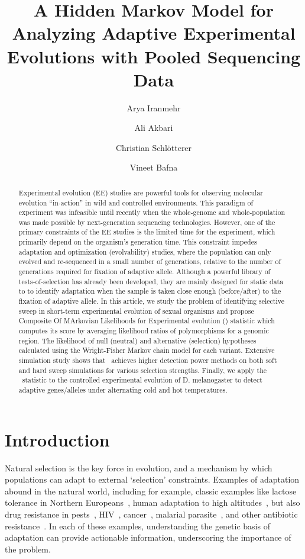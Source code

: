 \documentclass[11pt]{article}
\title{A Hidden Markov Model for Analyzing Adaptive Experimental Evolutions with Pooled Sequencing Data}
\author[1]{Arya Iranmehr}
\author[1]{Ali Akbari}
\author[2]{Christian Schl\"{o}tterer}
\author[3]{Vineet Bafna}
\affil[1]{\footnotesize Electrical and Computer Engineering, University of California, San Diego, La Jolla, CA 92093, USA.}
\affil[2]{\footnotesize Institut f\"{u}r Populationsgenetik, Vetmeduni, Vienna, Austria.}
\affil[3]{\footnotesize Computer Science \& Engineering, University of California, San Diego, La Jolla, CA 92093, USA}
\date{}
\def\comale{\text{{\sc Comale}}}
\begin{document}
\maketitle
\begin{abstract}
  Experimental evolution (EE) studies are powerful tools for observing
  molecular evolution ``in-action'' in wild and controlled
  environments. This paradigm of experiment was infeasible until
  recently when the whole-genome and whole-population was made
  possible by next-generation sequencing technologies.  However, one
  of the primary constraints of the EE studies is the limited time for
  the experiment, which primarily depend on the organism's generation
  time. This constraint impedes adaptation and optimization
  (evolvability) studies, where the population can only evolved and
  re-sequenced in a small number of generations, relative to the
  number of generations required for fixation of adaptive allele.
  Although a powerful library of tests-of-selection has already been
  developed, they are mainly designed for static data to to identify
  adaptation when the sample is taken close enough (before/after) to
  the fixation of adaptive allele.  In this article, we study the
  problem of identifying selective sweep in short-term experimental
  evolution of sexual organisms and propose Composite Of MArkovian
  Likelihoods for Experimental evolution (\comale) statistic which
  computes its score by averaging likelihood ratios of polymorphisms
  for a genomic region.  The likelihood of null (neutral) and
  alternative (selection) hypotheses calculated using the
  Wright-Fisher Markov chain model for each variant. Extensive
  simulation study shows that \comale\ achieves higher detection power
  methods on both soft and hard sweep simulations for various
  selection strengths.  Finally, we apply the \comale\ statistic to
  the controlled experimental evolution of D. melanogaster to detect
  adaptive genes/alleles under alternating cold and hot temperatures.
\end{abstract}



\section{Introduction}

Natural selection is the key force in evolution, and a mechanism by
which populations can adapt to external `selection'
constraints. Examples of adaptation abound in the natural world,
including for example, classic examples like lactose tolerance in
Northern Europeans~\cite{bersaglieri2004genetic}, human adaptation to high
altitudes~\cite{yi2010sequencing,simonson2010genetic}, but also drug resistance in
pests~\cite{daborn2001ddt}, HIV~\cite{Feder2016More},
cancer~\cite{gottesman2002mechanisms,zahreddine2013mechanisms},
malarial parasite~\cite{ariey2014molecular,nair2007recurrent}, and
other antibiotic resistance~\cite{spellberg2008epidemic}. In each of
these examples, understanding the genetic basis of adaptation can
provide actionable information, underscoring the importance of the
problem.
\end{document}
